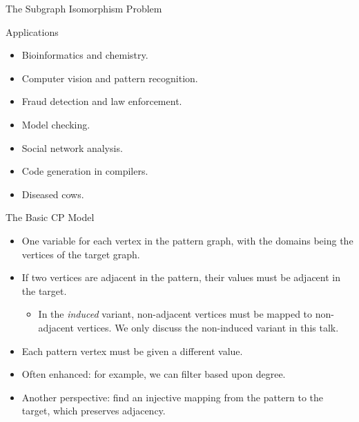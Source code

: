 \documentclass{beamer}
\begin{document}
\begin{frame}{The Subgraph Isomorphism Problem}

\end{frame}

\begin{frame}{Applications}
    \begin{itemize}
        \item Bioinformatics and chemistry.
        \item Computer vision and pattern recognition.
        \item Fraud detection and law enforcement.
        \item Model checking.
        \item Social network analysis.
        \item Code generation in compilers.
        \item Diseased cows.
    \end{itemize}
\end{frame}

\begin{frame}{The Basic CP Model}
    \begin{itemize}
        \item One \textcolor{uofgrose}{variable for each vertex in the pattern} graph,
        with the \textcolor{uofgrose}{domains being the vertices of the target} graph.
    \item If two vertices are \textcolor{uofgrose}{adjacent in the pattern}, their
        \textcolor{uofgrose}{values must be adjacent} in the target.
            \begin{itemize}
                \item In the \emph{induced} variant, non-adjacent vertices must be mapped to
                    non-adjacent vertices. We only discuss the non-induced variant in this talk.
            \end{itemize}
        \item Each pattern vertex must be given a \textcolor{uofgrose}{different value}.
        \item Often enhanced: for example, we can filter based upon degree.
        \item Another perspective: find an \textcolor{uofgrose}{injective mapping} from the
            pattern to the target, which \textcolor{uofgrose}{preserves adjacency}.
    \end{itemize}
\end{frame}
\end{document}

